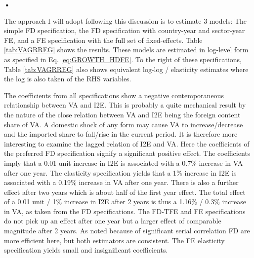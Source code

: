 \textbf{\textbf{•}}\documentclass[a4paper]{article}
\begin{document}
The approach I will adopt following this discussion is to estimate 3 models: The simple FD specification, the FD specification with country-year and sector-year FE, and a FE specification with the full set of fixed-effects. Table \ref{tab:VAGRREG} shows the results. %
These models are estimated in log-level form as specified in Eq. \ref{eq:GROWTH_HDFE}. To the right of these specifications, Table  \ref{tab:VAGRREG} also shows equivalent log-log / elasticity estimates where the log is also taken of the RHS variables. \newline 

The coefficients from all specifications show a negative contemporaneous relationship between VA and I2E. This is probably a quite mechanical result by the nature of the close relation between VA and I2E being the foreign content share of VA. A domestic shock of any form may cause VA to increase/decrease and the imported share to fall/rise in the current period. It is therefore more interesting to examine the lagged relation of I2E and VA. Here the coefficients of the preferred FD specification signify a significant positive effect. The coefficients imply that a 0.01 unit increase in I2E is associated with a 0.7\% increase in VA after one year. The elasticity specification yields that a 1\% increase in I2E is associated with a 0.19\% increase in VA after one year. There is also a further effect after two years which is about half of the first year effect. The total effect of a 0.01 unit / 1\% increase in I2E after 2 years is thus a 1.16\% / 0.3\% increase in VA, as taken from the FD specifications. The FD-TFE and FE specifications do not pick up an effect after one year but a larger effect of comparable magnitude after 2 years. As noted because of significant serial correlation FD are more efficient here, but both estimators are consistent. The FE elasticity specification yields small and insignificant coefficients.    %
\end{document}
